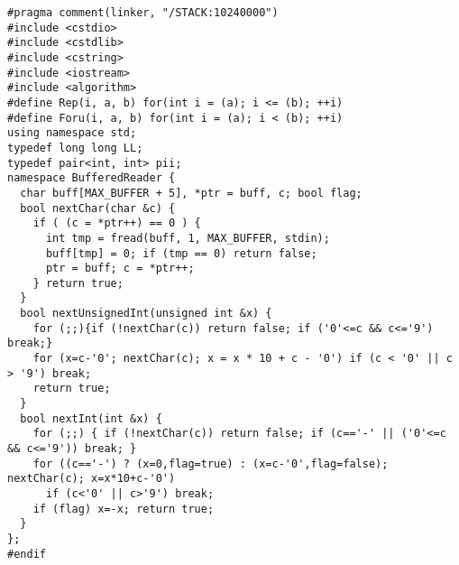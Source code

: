 \begin{lstlisting}
#pragma comment(linker, "/STACK:10240000")
#include <cstdio>
#include <cstdlib>
#include <cstring>
#include <iostream>
#include <algorithm>
#define Rep(i, a, b) for(int i = (a); i <= (b); ++i)
#define Foru(i, a, b) for(int i = (a); i < (b); ++i)
using namespace std;
typedef long long LL;
typedef pair<int, int> pii;
namespace BufferedReader {
  char buff[MAX_BUFFER + 5], *ptr = buff, c; bool flag;
  bool nextChar(char &c) {
    if ( (c = *ptr++) == 0 ) {
      int tmp = fread(buff, 1, MAX_BUFFER, stdin);
      buff[tmp] = 0; if (tmp == 0) return false;
      ptr = buff; c = *ptr++;
    } return true;
  }
  bool nextUnsignedInt(unsigned int &x) {
    for (;;){if (!nextChar(c)) return false; if ('0'<=c && c<='9') break;}
    for (x=c-'0'; nextChar(c); x = x * 10 + c - '0') if (c < '0' || c > '9') break;
    return true;
  }
  bool nextInt(int &x) {
    for (;;) { if (!nextChar(c)) return false; if (c=='-' || ('0'<=c && c<='9')) break; }
    for ((c=='-') ? (x=0,flag=true) : (x=c-'0',flag=false); nextChar(c); x=x*10+c-'0')
      if (c<'0' || c>'9') break;
    if (flag) x=-x; return true;
  }
};
#endif

\end{lstlisting}